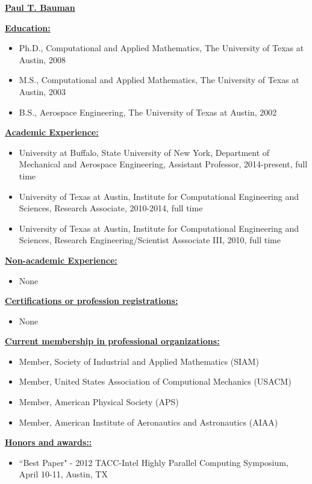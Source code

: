 \documentclass[12pt]{article}
\newcommand{\makeheading}[1]%
        {\hspace*{-\marginparsep minus \marginparwidth}%
         	\begin{center}
                {\underline{\bfseries #1}}\\%
                 \end{center}
         }
\newcommand{\makesection}[1]{\underline{\bfseries #1:}}
\begin{document}
\makeheading{Paul T. Bauman}

\makesection{Education}
\begin{itemize}
\item Ph.D., Computational and Applied Mathematics, The University of Texas at Austin, 2008
\item M.S., Computational and Applied Mathematics, The University of Texas at Austin, 2003
\item B.S., Aerospace Engineering, The University of Texas at Austin, 2002
\end{itemize}

\makesection{Academic Experience}
\begin{itemize}
\item University at Buffalo, State University of New York, Department of Mechanical
and Aerospace Engineering, Assistant Professor, 2014-present, full time
\item University of Texas at Austin, Institute for Computational Engineering and Sciences,
Research Associate, 2010-2014, full time
\item University of Texas at Austin, Institute for Computational Engineering and Sciences,
Research Engineering/Scientist Asssociate III, 2010, full time
\end{itemize}

\makesection{Non-academic Experience}
\begin{itemize}
\item None
\end{itemize}

\makesection{Certifications or profession registrations}
\begin{itemize}
\item None
\end{itemize}

\makesection{Current membership in professional organizations}
\begin{itemize}
\item Member, Society of Industrial and Applied Mathematics (SIAM)
\item Member, United States Association of Computional Mechanics (USACM)
\item Member, American Physical Society (APS)
\item Member, American Institute of Aeronautics and Astronautics (AIAA)
\end{itemize}

\makesection{Honors and awards:}
\begin{itemize}
\item ``Best Paper" - 2012 TACC-Intel Highly Parallel Computing Symposium, April 10-11, Austin, TX
\end{itemize}
\end{document}
